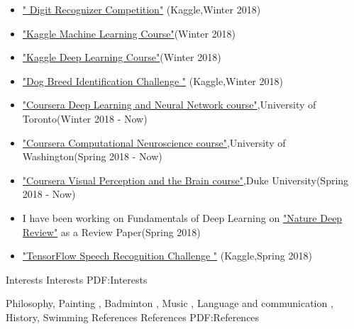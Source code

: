 \documentclass[letterpaper,MMMyyyy,nonstopmode]{simpleresumecv}
\begin{document}
\begin{Body}
\begin{itemize}
\begin{itemize}
	      \end{itemize}
	      	    \item  \href {https://www.kaggle.com/c/digit-recognizer}{" Digit Recognizer Competition"} (Kaggle,Winter 2018)
        \item
        \href {https://www.kaggle.com/learn/machine-learning}{"Kaggle Machine Learning Course"}(Winter 2018)
        
         \item
        \href {https://www.kaggle.com/learn/deep-learning}{"Kaggle Deep Learning Course"}(Winter 2018)
        
         	\item 
      \href{ https://www.kaggle.com/c/dog-breed-identification}{"Dog Breed Identification Challenge "} (Kaggle,Winter 2018)
       
        \item \href {https://www.coursera.org/learn/neural-networks/home/welcome}{"Coursera Deep Learning and Neural Network course"},University of Toronto(Winter 2018 - Now)
        
           \item \href {https://www.coursera.org/learn/computational-neuroscience/home/welcome}{"Coursera Computational Neuroscience course"},University of Washington(Spring 2018 - Now)
           
                 \item \href {https://www.coursera.org/learn/visual-perception/home/welcome}{"Coursera Visual Perception and the Brain course"},Duke University(Spring 2018 - Now)
           
        
        \item  I have been working on Fundamentals of Deep Learning on \href{       https://www.cs.toronto.edu/~hinton/absps/NatureDeepReview.pdf}
		{"Nature Deep Review"} as a Review Paper(Spring 2018)
 
       	
       	\item 
      \href{https://www.kaggle.com/c/tensorflow-speech-recognition-challenge}{"TensorFlow Speech Recognition Challenge "} (Kaggle,Spring 2018)
\end{itemize}



\Section
{Interests}
{Interests}
{PDF:Interests}

\Entry
Philosophy,
Painting ,
Badminton ,
Music ,  
Language  and communication ,
History,
Swimming
\Section
{References}
{References}
{PDF:References}


\end{Body}
\end{document}
